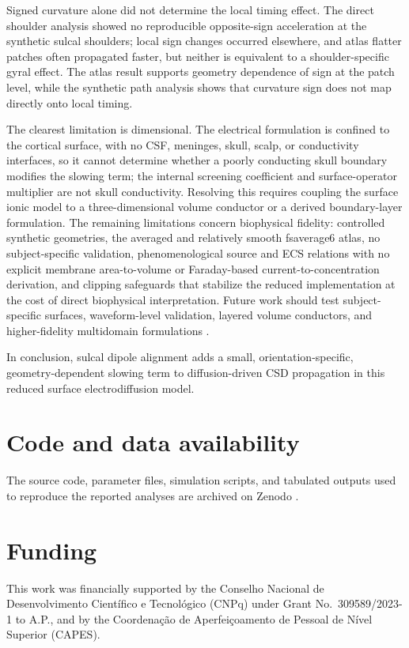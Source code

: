 \documentclass[12pt]{article}
\begin{document}
Signed curvature alone did not determine the local timing effect. The direct shoulder analysis showed no reproducible opposite-sign acceleration at the synthetic sulcal shoulders; local sign changes occurred elsewhere, and atlas flatter patches often propagated faster, but neither is equivalent to a shoulder-specific gyral effect. The atlas result supports geometry dependence of sign at the patch level, while the synthetic path analysis shows that curvature sign does not map directly onto local timing.

The clearest limitation is dimensional. The electrical formulation is confined to the cortical surface, with no CSF, meninges, skull, scalp, or conductivity interfaces, so it cannot determine whether a poorly conducting skull boundary modifies the slowing term; the internal screening coefficient and surface-operator multiplier are not skull conductivity. Resolving this requires coupling the surface ionic model to a three-dimensional volume conductor or a derived boundary-layer formulation. The remaining limitations concern biophysical fidelity: controlled synthetic geometries, the averaged and relatively smooth fsaverage6 atlas, no subject-specific validation, phenomenological source and ECS relations with no explicit membrane area-to-volume or Faraday-based current-to-concentration derivation, and clipping safeguards that stabilize the reduced implementation at the cost of direct biophysical interpretation. Future work should test subject-specific surfaces, waveform-level validation, layered volume conductors, and higher-fidelity multidomain formulations \citep{Kelley2022,Saetra2024,Andrew2022}.

In conclusion, sulcal dipole alignment adds a small, orientation-specific, geometry-dependent slowing term to diffusion-driven CSD propagation in this reduced surface electrodiffusion model.

\section*{Code and data availability}
The source code, parameter files, simulation scripts, and tabulated outputs used to reproduce the reported analyses are archived on Zenodo \citep{PereiraCSDModel2026}.

\section*{Funding}
This work was financially supported by the Conselho Nacional de Desenvolvimento Cient\'ifico e Tecnol\'ogico (CNPq) under Grant No.~309589/2023-1 to A.P., and by the Coordena\c{c}\~ao de Aperfei\c{c}oamento de Pessoal de N\'ivel Superior (CAPES).
\end{document}
